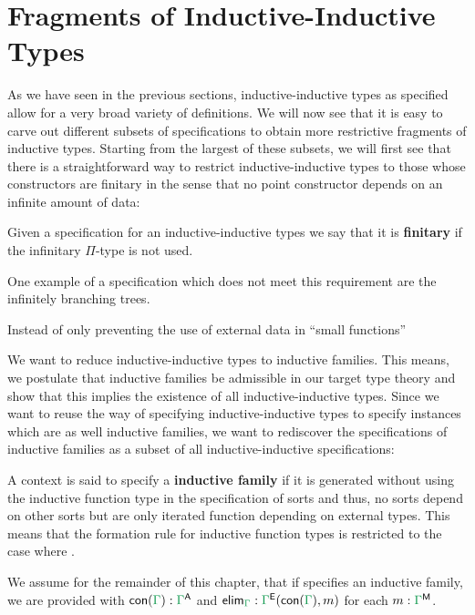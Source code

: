 \section{Fragments of Inductive-Inductive Types}

As we have seen in the previous sections, inductive-inductive types as specified
allow for a very broad variety of definitions.
We will now see that it is easy to carve out different subsets of specifications
to obtain more restrictive fragments of inductive types.
Starting from the largest of these subsets, we will first see that there is a
straightforward way to restrict inductive-inductive types to those whose constructors
are finitary in the sense that no point constructor depends on an infinite
amount of data: %

\begin{defn}
Given a specification \grm{\Gamma} for an inductive-inductive types we say that
it is \textbf{finitary} if the infinitary $\Pi$-type is not used.
\end{defn}

One example of a specification which does not meet this requirement are the
infinitely branching trees. %

Instead of only preventing the use of external data in ``small functions''

We want to reduce inductive-inductive types to inductive families.
This means, we postulate that inductive families be admissible in our target
type theory and show that this implies the existence of all inductive-inductive
types.
Since we want to reuse the way of specifying inductive-inductive types to specify
instances which are as well inductive families, we want to rediscover the specifications
of inductive families as a subset of all inductive-inductive specifications:

\begin{defn}
A context \grm{\Gamma} is said to specify a \textbf{inductive family} if it is
generated without using the inductive function type in the specification of sorts
and thus, no sorts depend on other sorts but are only iterated function depending
on external types.
This means that the formation rule for inductive function types is restricted
to the case where .
\end{defn}

We assume for the remainder of this chapter, that if \grm{\Gamma} specifies an
inductive family, we are provided with $\con{\Gamma} : \grm{\Gamma}^\CC$ and
$\elim_\grm{\Gamma} : \grm{\Gamma}^\EE(\con{\Gamma}, m)$ for each
$m : \grm{\Gamma}^\MM$.

